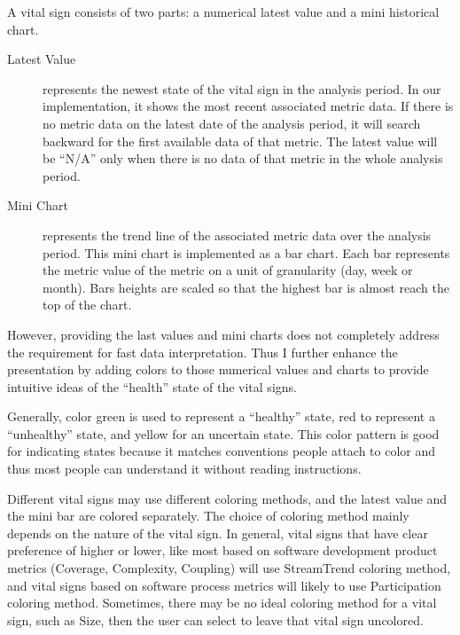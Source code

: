 A vital sign consists of two parts: a numerical latest value and a mini historical chart. 
\begin{description}
\item[Latest Value] represents the newest state of the vital sign in the analysis period. In our implementation, it shows the most recent associated metric data. If there is no metric data on the latest date of the analysis period, it will search backward for the first available data of that metric. The latest value will be ``N/A'' only when there is no data of that metric in the whole analysis period.
\item[Mini Chart] represents the trend line of the associated metric data over the analysis period. This mini chart is implemented as a bar chart. Each bar represents the metric value of the metric on a unit of granularity (day, week or month). Bars heights are scaled so that the highest bar is almost reach the top of the chart.
\end{description}

However, providing the last values and mini charts does not completely address the requirement for fast data interpretation. Thus I further enhance the presentation by adding colors to those numerical values and charts to provide intuitive ideas of the ``health'' state of the vital signs.

Generally, color green is used to represent a ``healthy'' state, red to represent a ``unhealthy'' state, and yellow for an uncertain state. This color pattern is good for indicating states because it matches conventions people attach to color and thus most people can understand it without reading instructions.

Different vital signs may use different coloring methods, and the latest value and the mini bar are colored separately. The choice of coloring method mainly depends on the nature of the vital sign. In general, vital signs that have clear preference of higher or lower, like most based on software development product metrics (Coverage, Complexity, Coupling) will use StreamTrend coloring method, and vital signs based on software process metrics will likely to use Participation coloring method. Sometimes, there may be no ideal coloring method for a vital sign, such as Size, then the user can select to leave that vital sign uncolored.

